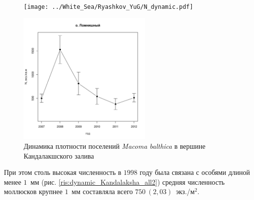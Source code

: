 \documentclass[12pt, a4paper]{disser}
\begin{document}
\begin{figure}[h]
	\begin{minipage}[b]{.46\linewidth}
	\begin{center}
		\texttt{[image: ../White\_Sea/Ryashkov\_YuG/N\_dynamic.pdf]}
	\end{center}
	\end{minipage}
%
	\hfil %
%
	\begin{minipage}[b]{.46\linewidth}
	\begin{center}
		\includegraphics[width=65mm]{../White_Sea/Lomnishniy/N_dynamic.pdf}
	\end{center}
	\end{minipage}



	\caption{Динамика плотности поселений {\it Macoma balthica} в вершине Кандалакшского залива}
	\label{ris:dynamic_Kandalaksha_all}
	\end{figure}
При этом столь высокая численность в $1998$ году была связана с особями длиной менее $1$~мм (рис. \ref{ris:dynamic_Kandalaksha_all2}) \textemdash средняя численность моллюсков крупнее $1$~мм составляла всего $750~(2,03)$~экз./м$^2$.
\end{document}
